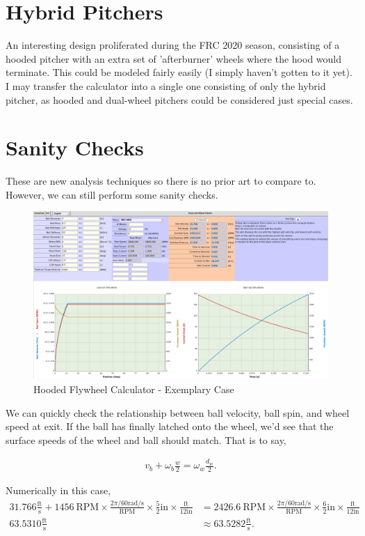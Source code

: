 \documentclass[10pt,letterpaper]{article}
\begin{document}
\section{Hybrid Pitchers}
An interesting design proliferated during the FRC 2020 season, consisting of a hooded pitcher with an extra set of 'afterburner' wheels where the hood would terminate. This could be modeled fairly easily (I simply haven't gotten to it yet). I may transfer the calculator into a single one consisting of only the hybrid pitcher, as hooded and dual-wheel pitchers could be considered just special cases.

\section{Sanity Checks}
	These are new analysis techniques so there is no prior art to compare to. However, we can still perform some sanity checks.

	\begin{figure}[H]
		\includegraphics[width=\textwidth]{validation/hood_EC_A.png}
		\caption{Hooded Flywheel Calculator - Exemplary Case}
	\end{figure}

	We can quickly check the relationship between ball velocity, ball spin, and wheel speed at exit. If the ball has finally latched onto the wheel, we'd see that the surface speeds of the wheel and ball should match. That is to say,

	\begin{align}
		v_b + \omega_b \frac{w}{2} = \omega_w \frac{d_w}{2}.
	\end{align}

	Numerically in this case,
	\begin{align}
		31.766 \frac{\text{ft}}{\text{s}} + 1456 \ \text{RPM} \times \frac{2 \pi / 60 \text{rad/s}}{\text{RPM}} \times \frac{5}{2} \text{in} \times \frac{\text{ft}}{12 \text{in}} &= 2426.6 \ \text{RPM} \times \frac{2 \pi / 60 \text{rad/s}}{\text{RPM}} \times \frac{6}{2} \text{in} \times \frac{\text{ft}}{12 \text{in}} \\
		63.5310 \frac{\text{ft}}{\text{s}} &\approx 63.5282 \frac{\text{ft}}{\text{s}} .
	\end{align}
\end{document}
